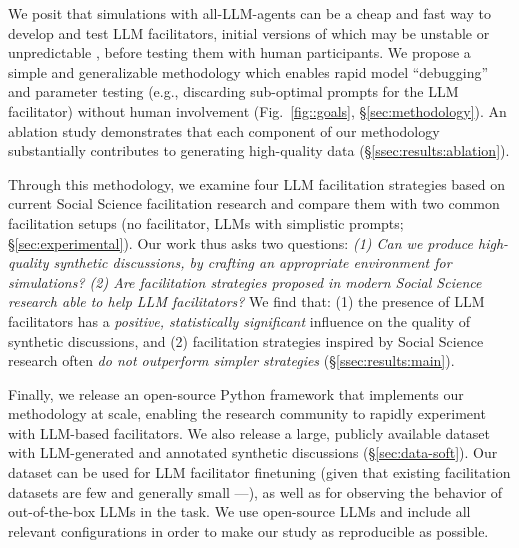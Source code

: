 We posit that simulations with all-LLM-agents can be a cheap and fast way to develop and test  LLM facilitators, initial versions of which may be unstable or unpredictable \cite{atil_2025, rossi_2024}, before testing them with human participants. We propose a simple and generalizable methodology which enables rapid model “debugging” and parameter testing (e.g., discarding sub-optimal  prompts for the LLM facilitator) without human involvement (Fig.~\ref{fig::goals}, \S\ref{sec:methodology}). An ablation study demonstrates that each component of our methodology substantially contributes to generating high-quality data (\S\ref{ssec:results:ablation}). 

Through this methodology, we examine  four LLM facilitation strategies based on current Social Science facilitation research and compare them with two common facilitation setups (no facilitator, LLMs with simplistic prompts; \S\ref{sec:experimental}). Our work thus asks two questions: \emph{(1) Can we produce high-quality synthetic discussions, by crafting an appropriate environment for simulations? (2) Are facilitation strategies proposed in modern Social Science research able to help LLM facilitators?} We find that: (1) the presence of LLM facilitators has a \emph{positive, statistically significant} influence on the quality of synthetic discussions, and (2) facilitation strategies inspired by Social Science research often \emph{do not outperform simpler strategies} (\S\ref{ssec:results:main}).

Finally, we release an open-source Python framework that implements our methodology at scale, enabling the research community to rapidly experiment with LLM-based facilitators. We also release \vmd a large, publicly available dataset with LLM-generated and annotated synthetic discussions (\S\ref{sec:data-soft}). Our dataset can be used for LLM facilitator finetuning \cite{ulmer2024} (given that existing facilitation datasets are few and generally small ---\citet{korre2025evaluation}), as well as for observing the behavior of out-of-the-box LLMs in the task. We use open-source LLMs and include all relevant configurations in order to make our study as reproducible as possible.
